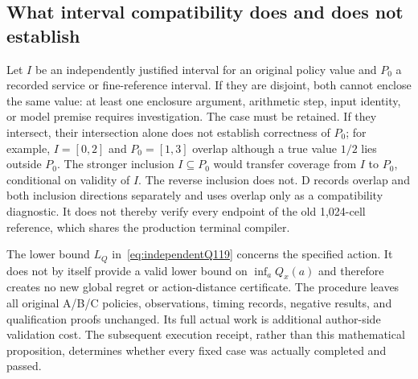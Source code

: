 \subsection{What interval compatibility does and does not establish}
Let $I$ be an independently justified interval for an original policy
value and $P_0$ a recorded service or fine-reference interval.  If they
are disjoint, both cannot enclose the same value: at least one enclosure
argument, arithmetic step, input identity, or model premise requires
investigation.  The case must be retained.  If they intersect, their
intersection alone does not establish correctness of $P_0$; for example,
$I=[0,2]$ and $P_0=[1,3]$ overlap although a true value $1/2$ lies
outside $P_0$.  The stronger inclusion $I\subseteq P_0$ would transfer
coverage from $I$ to $P_0$, conditional on validity of $I$.
The reverse inclusion does not.  D records overlap and both inclusion
directions separately and uses overlap only as a compatibility diagnostic.
It does not thereby verify every endpoint of the old 1,024-cell reference,
which shares the production terminal compiler.

The lower bound $L_Q$ in~\eqref{eq:independentQ119} concerns the
specified action.  It does not by itself provide a valid lower bound on
$\inf_aQ_x(a)$ and therefore creates no new global regret or
action-distance certificate.
The procedure leaves all original A/B/C policies, observations, timing
records, negative results, and qualification proofs unchanged.  Its full
actual work is additional author-side validation cost.  The subsequent
execution receipt, rather than this mathematical proposition, determines
whether every fixed case was actually completed and passed.
